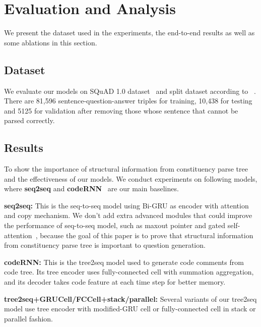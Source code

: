 \section{Evaluation and Analysis}
\label{sec:eval}
We present the dataset used in the experiments, 
the end-to-end results as well as some ablations in this section.

\subsection{Dataset}
We evaluate our models on SQuAD 1.0 dataset~\cite{rajpurkar2016squad} and split dataset according to 
\citeauthor{SubramanianWYT17}~. 
There are 81,596 sentence-question-answer triples for training, 
10,438 for testing and 5125 for validation after removing 
those whose sentence that cannot be parsed correctly.

%

\subsection{Results}
To show the importance of structural information from 
constituency parse tree and the effectiveness of our models. 
We conduct experiments on following models, 
where {\bf seq2seq} and {\bf codeRNN}~\cite{liang2018automatic} are 
our main baselines.

{\bf seq2seq:} This is the seq-to-seq model using Bi-GRU as encoder with attention and copy mechanism. We don't add extra advanced modules that could improve the performance of seq-to-seq model, such as maxout pointer and gated self-attention~\cite{zhao2018paragraph}, because the goal of this paper is to prove that structural information from constituency parse tree is important to question generation.

{\bf codeRNN:} This is the tree2seq model used to generate code comments from code tree. Its tree encoder uses fully-connected cell with summation aggregation, and its decoder takes code feature at each time step for better memory.

{\bf tree2seq+GRUCell/FCCell+stack/parallel:} Several variants of
our tree2seq model use tree encoder with modified-GRU cell or 
fully-connected cell in stack or parallel fashion.


